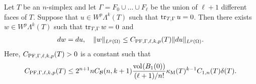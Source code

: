 \documentclass[10pt,a4paper]{article}
\begin{document}
\begin{lemma}\label{lemma:mixedbconsimplex:exteriorderivative}
    Let $T$ be an $n$-simplex 
    and let $\Gamma = F_{0} \cup \dots \cup F_{\ell}$ be the union of $\ell+1$ different faces of $T$. 
    Suppose that $u \in W^{p}\Lambda^{k}(T)$ such that 
    $\operatorname{tr}_{T,\Gamma} u = 0$.
    Then there exists $w \in W^{p}\Lambda^{k}(T)$ such that 
    $\operatorname{tr}_{T,\Gamma} w = 0$
    and  
    \begin{align*}
        d w = d u,
        \quad 
        \| w \|_{L^{p}(\Omega)} 
        \leq 
        C_{{\rm PF},\Gamma,\ell,k,p}(T)
        \| d u \|_{L^{p}(\Omega)}
        .
    \end{align*}
    Here, $C_{{\rm PF},\Gamma,\ell,k,p}(T) > 0$ is a constant such that 
    \begin{align*}
        C_{{\rm PF},\Gamma,\ell,k,p}(T)
        \leq 
        2^{n+1} 
        n C_{{\mathcal B}}(n,k+1) \frac{ \operatorname{vol}_{}(B_1(0)) }{ (\ell+1)/n! } 
        \kappa_{\rm M}(T)^{k-1}
        C_{1,n}(T) 
        {\delta}(T)
        .
    \end{align*}
\end{lemma}
\end{document}
